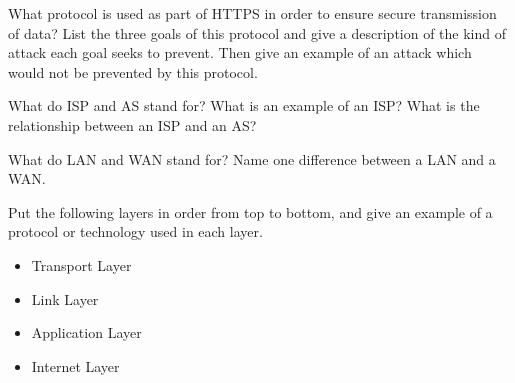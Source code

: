 \exercisesection

\begin{exercise}
    What protocol is used as part of HTTPS in order to ensure secure transmission of data? List the three goals of this protocol and give a description of the kind of attack each goal seeks to prevent. Then give an example of an attack which would not be prevented by this protocol.
\end{exercise}



\begin{exercise}
    What do ISP and AS stand for? What is an example of an ISP? What is the relationship between an ISP and an AS?
\end{exercise}

\begin{exercise}
    What do LAN and WAN stand for? Name one difference between a LAN and a WAN.
\end{exercise}


\begin{exercise}
    Put the following layers in order from top to bottom, and give an example of a protocol or technology used in each layer.
    \begin{itemize}
        \item Transport Layer
        \item Link Layer
        \item Application Layer
        \item Internet Layer
    \end{itemize}
\end{exercise}

